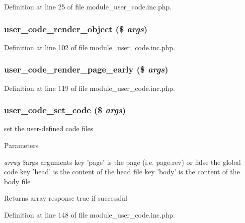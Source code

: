 Definition at line 25 of file module\_\-user\_\-code.inc.php.

\hypertarget{module__user__code_8inc_8php_ae2a601394f96c69bb105d73774d2aa29}{
\subsubsection[{user\_\-code\_\-render\_\-object}]{\setlength{\rightskip}{0pt plus 5cm}user\_\-code\_\-render\_\-object (\$ {\em args})}}
\label{module__user__code_8inc_8php_ae2a601394f96c69bb105d73774d2aa29}


Definition at line 102 of file module\_\-user\_\-code.inc.php.

\hypertarget{module__user__code_8inc_8php_ac616caa2e8476e976c51e8b833e6d55b}{
\subsubsection[{user\_\-code\_\-render\_\-page\_\-early}]{\setlength{\rightskip}{0pt plus 5cm}user\_\-code\_\-render\_\-page\_\-early (\$ {\em args})}}
\label{module__user__code_8inc_8php_ac616caa2e8476e976c51e8b833e6d55b}


Definition at line 119 of file module\_\-user\_\-code.inc.php.

\hypertarget{module__user__code_8inc_8php_a788372f1e959532d09dceb63209507cb}{
\subsubsection[{user\_\-code\_\-set\_\-code}]{\setlength{\rightskip}{0pt plus 5cm}user\_\-code\_\-set\_\-code (\$ {\em args})}}
\label{module__user__code_8inc_8php_a788372f1e959532d09dceb63209507cb}
set the user-\/defined code files


\begin{DoxyParams}{Parameters}
\item[{\em array}]\$args arguments key 'page' is the page (i.e. page.rev) or false the global code key 'head' is the content of the head file key 'body' is the content of the body file \end{DoxyParams}
\begin{DoxyReturn}{Returns}
array response true if successful 
\end{DoxyReturn}


Definition at line 148 of file module\_\-user\_\-code.inc.php.

